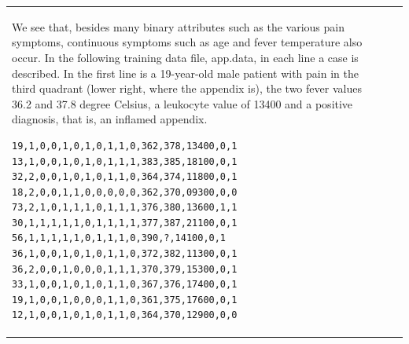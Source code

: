 \documentclass[10pt]{book}
\begin{document}
\begin{center}
\begin{tabular}{|l|l|l|}
We see that, besides many binary attributes such as the various pain symptoms, continuous symptoms such as age and fever temperature also occur. In the following training data file, app.data, in each line a case is described. In the first line is a 19-year-old male patient with pain in the third quadrant (lower right, where the appendix is), the two fever values 36.2 and 37.8 degree Celsius, a leukocyte value of 13400 and a positive diagnosis, that is, an inflamed appendix.
\begin{verbatim}
19,1,0,0,1,0,1,0,1,1,0,362,378,13400,0,1
13,1,0,0,1,0,1,0,1,1,1,383,385,18100,0,1
32,2,0,0,1,0,1,0,1,1,0,364,374,11800,0,1
18,2,0,0,1,1,0,0,0,0,0,362,370,09300,0,0
73,2,1,0,1,1,1,0,1,1,1,376,380,13600,1,1
30,1,1,1,1,1,0,1,1,1,1,377,387,21100,0,1
56,1,1,1,1,1,0,1,1,1,0,390,?,14100,0,1
36,1,0,0,1,0,1,0,1,1,0,372,382,11300,0,1
36,2,0,0,1,0,0,0,1,1,1,370,379,15300,0,1
33,1,0,0,1,0,1,0,1,1,0,367,376,17400,0,1
19,1,0,0,1,0,0,0,1,1,0,361,375,17600,0,1
12,1,0,0,1,0,1,0,1,1,0,364,370,12900,0,0
\end{verbatim}


\end{tabular}
\end{center}
\end{document}
